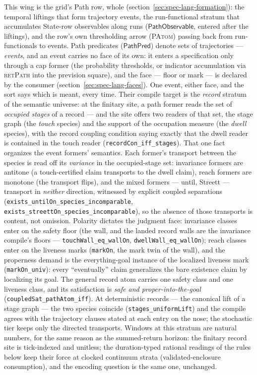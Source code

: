 This wing is the grid's Path row, whole
(section~\ref{sec:spec-lang-formation}): the temporal liftings that
form trajectory events, the run-functional stratum that accumulates
State-row observables along runs ($\mathsf{PathObservable}$, entered
after the liftings), and the row's own thresholding arrow
(\textsc{PAtom}) passing back from run-functionals to events.
Path predicates ($\mathsf{PathPred}$) denote sets of trajectories ---
\emph{events}, and an event carries no face of its own: it enters a
specification only through a cap former (the probability thresholds,
or indicator accumulation via \textsc{retPath} into the prevision
square), and the face --- floor or mark --- is declared by the
consumer (section~\ref{sec:spec-lang-faces}). One event, either
face, and the sort says which is meant,
every time. Their
compile target is the \emph{record} stratum of the semantic universe:
at the finitary site, a path former reads the set of \emph{occupied
stages} of a record --- and the site offers two readers of that set,
the stage graph (the \emph{touch} species) and the support of the
occupation measure (the \emph{dwell} species), with the record
coupling condition saying exactly that the dwell reader is contained
in the touch reader (\texttt{recordCon\_iff\_stages}). That one fact
organizes the event formers' semantics. Each former's transport between the
species is read off its \emph{variance} in the occupied-stage set:
invariance formers are antitone (a touch-certified claim transports
to the dwell claim), reach formers are monotone (the transport
flips), and the mixed formers --- until, Streett --- transport in
\emph{neither} direction, witnessed by explicit coupled separations
(\texttt{exists\_untilOn\_species\_incomparable},
\texttt{exists\_streettOn\_species\_incomparable}), so the absence
of those transports is content, not omission. Polarity dictates the
judgment face: invariance classes enter on the safety floor (the
wall, and the landed record walls are the invariance compile's
floors --- \texttt{touchWall\_eq\_wallOn},
\texttt{dwellWall\_eq\_wallOn}); reach classes enter on the liveness
marks (\texttt{markOn}, the mark twin of the wall), and the
properness demand is the everything-goal instance of the localized
liveness mark (\texttt{markOn\_univ}): every ``eventually'' claim
generalizes the bare existence claim by localizing its goal. The
general record atom carries one safety class and one liveness class,
and its satisfaction is \emph{safe and proper-into-the-goal}
(\texttt{coupledSat\_pathAtom\_iff}). At deterministic records ---
the canonical lift of a stage graph --- the two species coincide
(\texttt{stages\_uniformLift}) and the compile agrees with the
trajectory clauses stated at each entry on the nose; the stochastic
tier keeps only the directed transports. Windows at this stratum are
natural numbers, for the same reason as the summed-return horizon:
the finitary record site is tick-indexed and unitless; the
duration-typed rational readings of the rules below keep their force
at clocked continuum strata (validated-enclosure consumption), and the
encoding question is the same one, unchanged.

